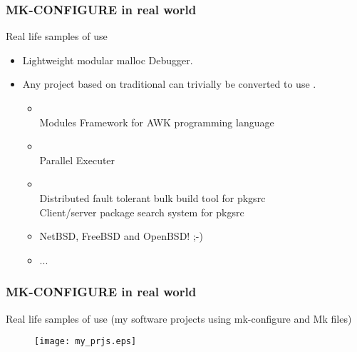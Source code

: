 \documentclass[hyperref={colorlinks=true}]{beamer}
\begin{document}
\begin{frame}[fragile,t]
  \frametitle{MK-CONFIGURE in real world}
  \begin{block}{Real life samples of use}
  \begin{itemize}
  \item Lightweight modular malloc Debugger.\\
  \item Any project based on traditional
     can trivially be converted
    to use .
    \begin{itemize}
    \item {}\\
      Modules Framework for AWK programming language
    \item {}\\
      Parallel Executer
    \item {}\\
      Distributed fault tolerant bulk build tool for pkgsrc
      \\
      Client/server package search system for pkgsrc
    \item NetBSD, FreeBSD and OpenBSD! ;-)
    \item ...
    \end{itemize}
  \end{itemize}
  \end{block}
\end{frame}


\begin{frame}[fragile,t]
  \frametitle{MK-CONFIGURE in real world}
  \begin{block}{Real life samples of use (my software projects using
      mk-configure and Mk files)}
    \begin{figure}
      \texttt{[image: my\_prjs.eps]}
    \end{figure}
  \end{block}
\end{frame}

\end{document}
